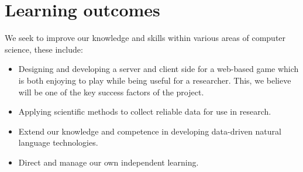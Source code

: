 \documentclass[11pt]{article}
\begin{document}
\section{Learning outcomes}
We seek to improve our knowledge and skills within various areas of computer science, these include:
\begin{itemize}
    \item Designing and developing a server and client side for a web-based game which
        is both enjoying to play while being useful for a researcher. This, we
        believe will be one of the key success factors of the project.
    \item Applying scientific methods to collect reliable data for use in
        research.
    \item Extend our knowledge and competence in developing data-driven natural
        language technologies.
    \item Direct and manage our own independent learning.
\end{itemize}



\end{document}
